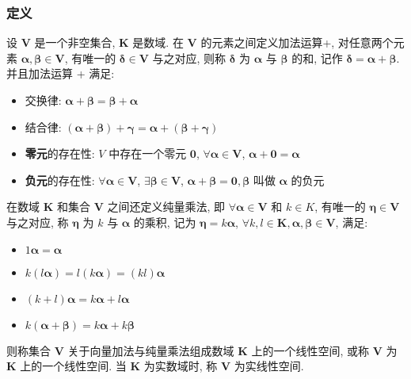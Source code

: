 \documentclass{article}
\begin{document}
			\subsubsection{定义}
				设 $\boldsymbol V$ 是一个非空集合, $\mathbf K$ 是数域. 在 $\boldsymbol V$ 的元素之间定义加法运算+, 对任意两个元素 $\boldsymbol{\alpha}, \boldsymbol{\beta} \in \boldsymbol V$, 有唯一的 $\boldsymbol{\delta} \in \boldsymbol V$ 与之对应, 则称 $\boldsymbol \delta$ 为 $\boldsymbol \alpha$ 与 $\boldsymbol \beta$ 的和, 记作 $\boldsymbol \delta=\boldsymbol \alpha+\boldsymbol \beta$. 并且加法运算 + 满足:
				\begin{itemize}
					\item 交换律: $\boldsymbol \alpha+\boldsymbol \beta=\boldsymbol \beta+\boldsymbol \alpha$
					\item 结合律: $(\boldsymbol{\alpha}+\boldsymbol{\beta})+\boldsymbol{\gamma}=\boldsymbol{\alpha}+(\boldsymbol{\beta}+\boldsymbol{\gamma})$
					\item \textbf{零元}的存在性: $V$ 中存在一个零元 $\mathbf{0}$, $\forall \boldsymbol{\alpha} \in \boldsymbol V$, $\boldsymbol{\alpha}+\mathbf{0}=\boldsymbol{\alpha}$
					\item \textbf{负元}的存在性: $\forall\boldsymbol{\alpha} \in \boldsymbol V$, $\exists\boldsymbol{\beta} \in \boldsymbol V$, $\boldsymbol{\alpha}+\boldsymbol{\beta}=\mathbf{0}, \boldsymbol{\beta}$ 叫做 $\boldsymbol{\alpha}$ 的负元
				\end{itemize}
				\qquad 在数域 $\mathbf K$ 和集合 $\boldsymbol V$ 之间还定义纯量乘法, 即 $\forall \boldsymbol \alpha \in\boldsymbol V$ 和 $k \in K$, 有唯一的 $\boldsymbol \eta \in \boldsymbol V$ 与之对应, 称 $\boldsymbol \eta$ 为 $k$ 与 $\boldsymbol{\alpha}$ 的乘积, 记为 $\boldsymbol{\eta}=k \boldsymbol{\alpha}$, $\forall k, l \in \mathbf K, \boldsymbol{\alpha}, \boldsymbol{\beta} \in \boldsymbol V$, 满足:
				\begin{itemize}
					\item $1 \boldsymbol \alpha=\boldsymbol \alpha$
					\item $k(l \boldsymbol{\alpha})=l(k \boldsymbol{\alpha})=(k l) \boldsymbol{\alpha}$
					\item $(k+l) \boldsymbol{\alpha}=k \boldsymbol{\alpha}+l \boldsymbol{\alpha}$
					\item $k(\boldsymbol{\alpha}+\boldsymbol{\beta})=k \boldsymbol{\alpha}+k \boldsymbol{\beta}$
				\end{itemize}
				则称集合 $\boldsymbol V$ 关于向量加法与纯量乘法组成数域 $\mathbf K$ 上的一个线性空间, 或称 $\boldsymbol V$ 为 $\mathbf K$ 上的一个线性空间. 当 $\mathbf K$ 为实数域时, 称 $\boldsymbol V$ 为实线性空间.
\end{document}
